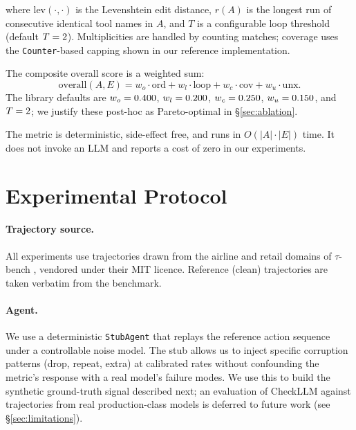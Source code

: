 \documentclass{article}
\begin{document}
where $\mathrm{lev}(\cdot,\cdot)$ is the Levenshtein edit distance,
$r(A)$ is the longest run of consecutive identical tool names in $A$,
and $T$ is a configurable loop threshold (default $T=2{}$).
Multiplicities are handled by counting matches; coverage uses the
\texttt{Counter}-based capping shown in our reference implementation.

The composite overall score is a weighted sum:
\begin{equation}
\text{overall}(A,E) =
w_o \cdot \text{ord} + w_l \cdot \text{loop} + w_c \cdot \text{cov} + w_u \cdot \text{unx}.
\label{eq:overall}
\end{equation}
The library defaults are $w_o=0.400{}$,
$w_l=0.200{}$, $w_c=0.250{}$,
$w_u=0.150{}$, and $T=2{}$;
we justify these post-hoc as Pareto-optimal in \S\ref{sec:ablation}.

The metric is deterministic, side-effect free, and runs in
$O(|A|\cdot|E|)$ time. It does not invoke an LLM and reports a cost
of zero in our experiments.

\section{Experimental Protocol}
\label{sec:protocol}

\paragraph{Trajectory source.} All experiments use trajectories drawn
from the airline and retail domains of $\tau$-bench
\citep{yao2024taubench}, vendored under their MIT licence.
Reference (clean) trajectories are taken verbatim from the benchmark.

\paragraph{Agent.} We use a deterministic \texttt{StubAgent} that
replays the reference action sequence under a controllable noise
model. The stub allows us to inject specific corruption patterns
(drop, repeat, extra) at calibrated rates without confounding the
metric's response with a real model's failure modes. We use this to
build the synthetic ground-truth signal described next; an evaluation
of CheckLLM against trajectories from real production-class models
is deferred to future work (see \S\ref{sec:limitations}).
\end{document}
